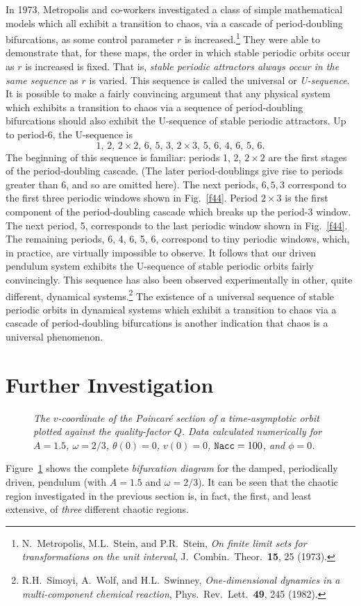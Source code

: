 In 1973, Metropolis and co-workers investigated a class of simple mathematical models which all
exhibit a transition to chaos, via a cascade of period-doubling bifurcations, as
some control parameter $r$ is increased.\footnote{N.~Metropolis,
M.L.~Stein, and P.R.~Stein, {\em On finite limit sets for transformations
on the unit interval}, J.\ Combin.\ Theor.\ {\bf 15}, 25 (1973).} They were able to demonstrate
that, for these maps,  the order in which stable periodic orbits occur as $r$ is
increased  is fixed. 
That is, {\em stable periodic attractors always occur in the same sequence} as
$r$ is varied. This sequence is
called the universal or {\em U-sequence}. It is possible to make a fairly
convincing argument that any physical system which exhibits a transition to chaos
via a sequence of period-doubling bifurcations should also exhibit the U-sequence
of stable periodic attractors.
Up to period-6, the U-sequence is
$$
1, \,2,\, 2\times 2,\, 6,\, 5,\, 3,\, 2\times 3,\, 5, \,6,\, 4,\, 6,\, 5,\, 6.
$$
The beginning of this sequence is familiar: periods 1, 2, $2\times 2$ are the
first stages of the  period-doubling cascade. (The later period-doublings
give rise to periods greater than 6, and so are omitted here). The next periods,
$6,5,3$ correspond to the first three periodic windows shown in Fig.~\ref{f44}. 
Period $2\times 3$ is the first component of the period-doubling cascade which
breaks up the period-3 window. The next period, 5, corresponds to the last
periodic window shown in Fig.~\ref{f44}. The remaining periods,
6, 4, 6, 5, 6, correspond to tiny periodic windows, which, in practice,
are virtually impossible to  observe. It follows that our
driven pendulum system exhibits the U-sequence of stable periodic orbits fairly
convincingly. This sequence has also been observed experimentally in other,
quite different, dynamical systems.\footnote{R.H.~Simoyi,
A.~Wolf, and H.L.~Swinney, {\em One-dimensional dynamics in a multi-component
chemical reaction}, Phys.\ Rev.\ Lett.\ {\bf 49}, 245 (1982).} The existence of
a universal sequence of stable periodic orbits in dynamical systems which
exhibit a transition to chaos via a cascade of period-doubling bifurcations
 is another indication that
chaos is a universal phenomenon.

\section{Further Investigation}
\begin{figure}
\epsfysize=3.5in
\centerline{}
\caption{\em The $v$-coordinate of the Poincar\'{e} section of a time-asymptotic orbit
plotted against the quality-factor $Q$. Data
 calculated numerically for
$A=1.5$, $\omega=2/3$, $\theta(0)=0$, $v(0)=0$, ${\tt Nacc} =100$, and $\phi=0$.}\label{f49}
\end{figure}
Figure~\ref{f49} shows the complete {\em bifurcation diagram} for the damped, periodically
driven, pendulum (with $A=1.5$ and $\omega=2/3$). 
 It can be seen that the chaotic region investigated in the previous section is, in fact,
the first, and least extensive, of {\em three} different chaotic regions. 



